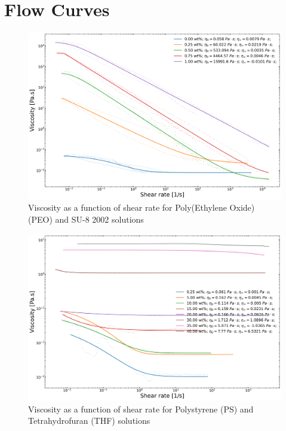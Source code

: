 
\chapter{Flow Curves} %

\label{Appendix_flowCurves} %

\begin{figure}[!th]
\centering
\includegraphics[width=\textwidth]{./Figures/plt_PEOwtinSU8.png}
\decoRule
\caption[Viscosity as a function of shear rate for Poly(Ethylene Oxide) (PEO) and SU-8 2002 solutions]{Viscosity as a function of shear rate for Poly(Ethylene Oxide) (PEO) and SU-8 2002 solutions}
\label{fig:plt_PEOwtinSU8}
\end{figure}

\begin{figure}[!th]
\centering
\includegraphics[width=\textwidth]{./Figures/plt_PSwtinTHF.png}
\decoRule
\caption[Viscosity as a function of shear rate for Polystyrene (PS) and Tetrahydrofuran (THF) solutions]{Viscosity as a function of shear rate for Polystyrene (PS) and Tetrahydrofuran (THF) solutions}
\label{fig:plt_PSwtinTHF}
\end{figure}

